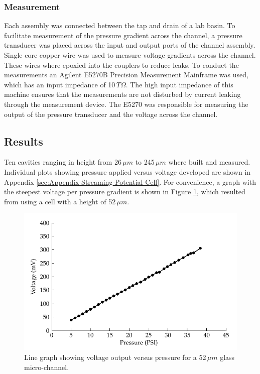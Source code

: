 \subsubsection{Measurement}

Each assembly was connected between the tap and drain of a lab basin.  To
facilitate measurement of the pressure gradient across the channel, a pressure
transducer was placed across the input and output ports of the channel
assembly. Single core copper wire was used to measure voltage gradients across
the channel. These wires where epoxied into the couplers to reduce leaks. To
conduct the measurements an Agilent E5270B Precision Measurement Mainframe was
used, which has an input impedance of 10${\displaystyle \, T\Omega}$. The high
input impedance of this machine ensures that the measurements are not disturbed
by current leaking through the measurement device. The E5270 was responsible
for measuring the output of the pressure transducer and the voltage across the
channel.


\subsection{Results}

Ten cavities ranging in height from 26$\,\mu m$ to 245$\,\mu m$ where built and
measured. Individual plots showing pressure applied versus voltage developed
are shown in Appendix \ref{sec:Appendix-Streaming-Potential-Cell}.  For
convenience, a graph with the steepest voltage per pressure gradient is shown
in Figure \ref{fig:streamingCell_voltVsPress_52um_convienient}, which resulted
from using a cell with a height of 52$\,\mu m$.

\begin{figure}[H] \centering
    \includegraphics{content/pt1/01-PowerHarvesting/graphics/streamingCell_voltVsPress_52um_out}
    \caption{\label{fig:streamingCell_voltVsPress_52um_convienient}Line graph
        showing voltage output versus pressure for a 52$\,\mu m$ glass
        micro-channel.} \end{figure}


